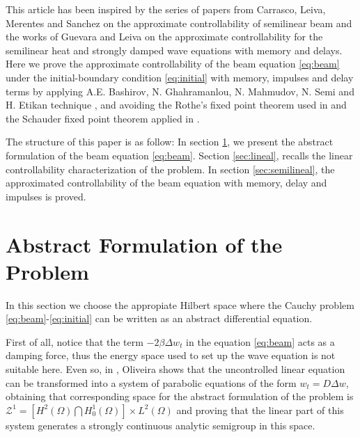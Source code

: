 \documentclass[11 pt]{amsart}
\begin{document}
This article has been inspired by the series of papers from Carrasco, Leiva, Merentes and
Sanchez \cite{Carrasco-Leiva:2013aa,Carrasco-Leiva:2014aa,Carrasco-Leiva:2016aa} on the approximate controllability of semilinear beam and the works of Guevara and Leiva  \cite{Guevara-Leiva:2016aa, Guevara-Leiva:2017aa} on the approximate controllability for the semilinear heat and strongly damped wave equations with memory and delays.
Here we prove the  approximate controllability of the beam equation  \eqref{eq:beam} under the initial-boundary condition \eqref{eq:initial}  with memory, impulses and delay terms  by applying   A.E. Bashirov, N. Ghahramanlou, N. Mahmudov, N. Semi and H. Etikan technique \cite{Bashirov-Ghahramanlou:2014aa, Bashirov-Jneid:2013aa, Bashirov-Mahmudov:2007aa},  and avoiding the Rothe's fixed point theorem used in \cite{Carrasco-Leiva:2013aa,Carrasco-Leiva:2016aa} and the   Schauder fixed point theorem applied in \cite{Carrasco-Leiva:2014aa}.

The structure of this paper is as follow: In section \ref{sec:formulation}, we present the abstract formulation of the beam equation \eqref{eq:beam}. Section \ref{sec:lineal}, recalls the linear controllability characterization of the problem. In section \ref{sec:semilineal}, the approximated controllability of the beam equation with memory, delay and impulses is proved.

\section{Abstract Formulation of the Problem} \label{sec:formulation}

In this section we choose the appropiate Hilbert space where the Cauchy problem \eqref{eq:beam}-\eqref{eq:initial}  can be written as an abstract differential equation.

 First of all, notice that the term $-2\beta\Delta w_t$ in the equation \eqref{eq:beam} acts as a damping force, thus the energy space used to set up the wave equation is not suitable here. Even so,  in   \cite{Oliveira:1998aa}, Oliveira shows that the uncontrolled linear  equation can be transformed into a system of parabolic equations of the form $w_{t} = D \Delta w$,  obtaining that corresponding space for the abstract formulation of the problem is ${\mathcal{Z}}^{1}=\left[H^{2}(\Omega) \bigcap H^{1}_{0}(\Omega) \right] \times L^{2}(\Omega)$ and proving that the linear part of this system generates a strongly continuous analytic semigroup in this space.
\end{document}
